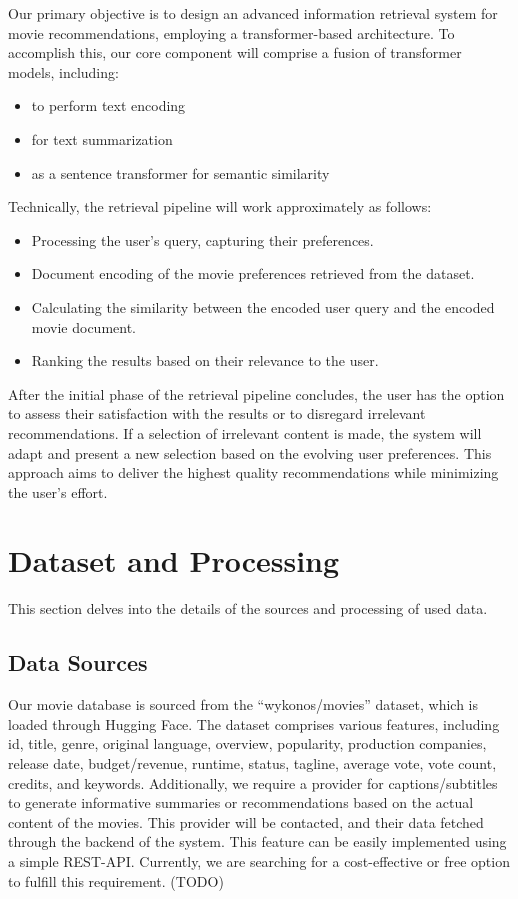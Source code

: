 \documentclass[11pt,a4paper]{article}
\begin{document}
  Our primary objective is to design an advanced information retrieval system for movie recommendations, employing a transformer-based architecture.
  To accomplish this, our core component will comprise a fusion of transformer models, including:
  \begin{itemize}
    \item to perform text encoding
    \item for text summarization
    \item as a sentence transformer for semantic similarity
  \end{itemize}

  \noindent Technically, the retrieval pipeline will work approximately as follows:
  \begin{itemize}
    \item Processing the user’s query, capturing their preferences.
    \item Document encoding of the movie preferences retrieved from the dataset.
    \item Calculating the similarity between the encoded user query and the encoded movie document.
    \item Ranking the results based on their relevance to the user.
  \end{itemize}

  \noindent After the initial phase of the retrieval pipeline concludes, the user has the option to assess their satisfaction with the results or to disregard irrelevant recommendations.
  If a selection of irrelevant content is made, the system will adapt and present a new selection based on the evolving user preferences.
  This approach aims to deliver the highest quality recommendations while minimizing the user’s effort.

  \section{Dataset and Processing}

  This section delves into the details of the sources and processing of used data.

  \subsection{Data Sources}

  Our movie database is sourced from the ``wykonos/movies'' dataset, which is loaded through Hugging Face.
  The dataset comprises various features, including id, title, genre, original language, overview, popularity, production companies, release date, budget/revenue, runtime, status, tagline, average vote, vote count, credits, and keywords.\newline\newline
  \noindent Additionally, we require a provider for captions/subtitles to generate informative summaries or recommendations based on the actual content of the movies.
  This provider will be contacted, and their data fetched through the backend of the system.
  This feature can be easily implemented using a simple REST-API. Currently, we are searching for a cost-effective or free option to fulfill this requirement. (TODO)
\end{document}
